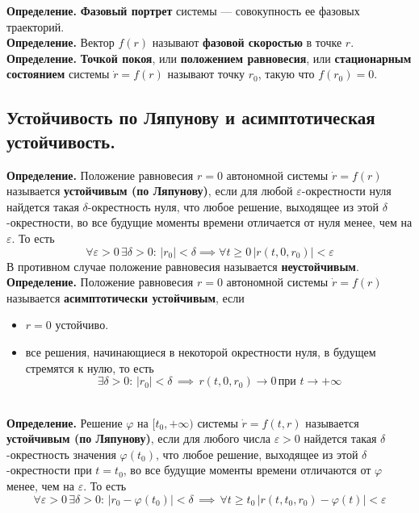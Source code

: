 \documentclass{article}
\begin{document}
\noindent \textbf{Определение.} \textbf{Фазовый портрет} системы --- совокупность ее фазовых траекторий.\\

\noindent \textbf{Определение.} Вектор $f(r)$ называют \textbf{фазовой скоростью} в точке $r$.\\

\noindent \textbf{Определение.} \textbf{Точкой покоя}, или \textbf{положением равновесия}, или \textbf{стационарным состоянием} системы $\dot{r} = f(r)$ называют точку $r_0$, такую что $f(r_0) = 0$.

\subsection{Устойчивость по Ляпунову и асимптотическая устойчивость.}
\textbf{Определение.} Положение равновесия $r = 0$ автономной системы $\dot{r} = f(r)$ называется \textbf{устойчивым (по Ляпунову)}, если для любой $\varepsilon$-окрестности нуля найдется такая $\delta$-окрестность нуля, что любое решение, выходящее из этой $\delta$-окрестности, во все будущие моменты времени отличается от нуля менее, чем на $\varepsilon$. То есть
\begin{equation*}
    \forall \varepsilon > 0\, \exists \delta > 0:\, |r_0| < \delta \implies \forall t \ge 0\, |r(t,0,r_0)| < \varepsilon
\end{equation*}
В противном случае положение равновесия называется \textbf{неустойчивым}.\\

\noindent \textbf{Определение.} Положение равновесия $r = 0$ автономной системы $\dot{r} = f(r)$ называется \textbf{асимптотически устойчивым}, если
\begin{itemize}
    \item $r = 0$ устойчиво.
    \item все решения, начинающиеся в некоторой окрестности нуля, в будущем стремятся к нулю, то есть
    \begin{equation*}
        \exists \delta > 0:\, |r_0| < \delta \, \implies \, r(t, 0, r_0) \to 0\, \text{при } t \to +\infty
    \end{equation*}
\end{itemize}\\

\noindent \textbf{Определение.} Решение $\varphi$ на $[t_0, +\infty)$ системы $\dot{r} = f(t,r)$ называется \textbf{устойчивым (по Ляпунову)}, если для любого числа $\varepsilon > 0$ найдется такая $\delta$-окрестность значения $\varphi(t_0)$, что любое решение, выходящее из этой $\delta$-окрестности при $t = t_0$, во все будущие моменты времени отличаются от $\varphi$ менее, чем на $\varepsilon$. То есть
\begin{equation*}
    \forall \varepsilon > 0\, \exists \delta > 0:\, |r_0 - \varphi(t_0)| < \delta \, \implies \, \forall t \ge t_0\, |r(t,t_0,r_0) - \varphi(t)| < \varepsilon
\end{equation*}\\
\end{document}
